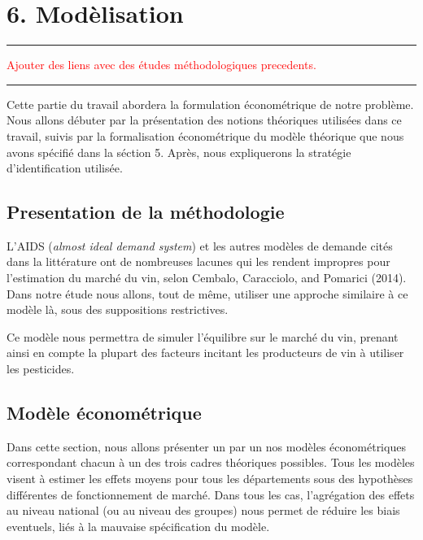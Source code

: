 \documentclass[11pt,]{article}
\begin{document}
\hypertarget{modelisation}{%
\section{6. Modèlisation}\label{modelisation}}

\noindent

\rule[0.5ex]{\linewidth}{1pt}

\textcolor{red}{Ajouter des liens avec des études méthodologiques precedents.}

\noindent

\rule[0.5ex]{\linewidth}{1pt}

Cette partie du travail abordera la formulation économétrique de notre
problème. Nous allons débuter par la présentation des notions théoriques
utilisées dans ce travail, suivis par la formalisation économétrique du
modèle théorique que nous avons spécifié dans la séction 5. Après, nous
expliquerons la stratégie d'identification utilisée.

\hypertarget{presentation-de-la-methodologie}{%
\subsection{Presentation de la
méthodologie}\label{presentation-de-la-methodologie}}

L'AIDS (\emph{almost ideal demand system}) et les autres modèles de
demande cités dans la littérature ont de nombreuses lacunes qui les
rendent impropres pour l'estimation du marché du vin, selon Cembalo,
Caracciolo, and Pomarici (2014). Dans notre étude nous allons, tout de
même, utiliser une approche similaire à ce modèle là, sous des
suppositions restrictives.

Ce modèle nous permettra de simuler l'équilibre sur le marché du vin,
prenant ainsi en compte la plupart des facteurs incitant les producteurs
de vin à utiliser les pesticides.

\hypertarget{modele-econometrique}{%
\subsection{Modèle économétrique}\label{modele-econometrique}}

Dans cette section, nous allons présenter un par un nos modèles
économétriques correspondant chacun à un des trois cadres théoriques
possibles. Tous les modèles visent à estimer les effets moyens pour tous
les départements sous des hypothèses différentes de fonctionnement de
marché. Dans tous les cas, l'agrégation des effets au niveau national
(ou au niveau des groupes) nous permet de réduire les biais eventuels,
liés à la mauvaise spécification du modèle.
\end{document}
